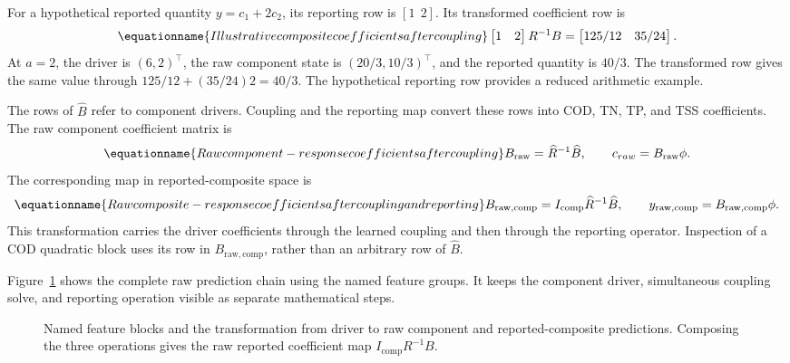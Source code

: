 For a hypothetical reported quantity \(y=c_1+2c_2\), its reporting row is \([1\ \ 2]\). Its transformed coefficient row is
\begin{equation}
\equationname{Illustrative composite coefficients after coupling}
\label{eq:icsor_small_composite_projection}
\begin{bmatrix}1&2\end{bmatrix}R^{-1}B
=\begin{bmatrix}125/12&35/24\end{bmatrix}.
\end{equation}
At \(a=2\), the driver is \((6,2)^\top\), the raw component state is \((20/3,10/3)^\top\), and the reported quantity is \(40/3\). The transformed row gives the same value through \(125/12+(35/24)2=40/3\). The hypothetical reporting row provides a reduced arithmetic example.

The rows of \(\widehat B\) refer to component drivers. Coupling and the reporting map convert these rows into COD, TN, TP, and TSS coefficients. The raw component coefficient matrix is
\begin{equation}
\equationname{Raw component-response coefficients after coupling}
\label{eq:icsor_raw_component_coefficients}
B_{\mathrm{raw}}=\widehat R^{-1}\widehat B,
\qquad c_{raw}=B_{\mathrm{raw}}\phi.
\end{equation}
The corresponding map in reported-composite space is
\begin{equation}
\equationname{Raw composite-response coefficients after coupling and reporting}
\label{eq:icsor_raw_composite_coefficients}
B_{\mathrm{raw,comp}}=I_{\mathrm{comp}}\widehat R^{-1}\widehat B,
\qquad y_{\mathrm{raw,comp}}=B_{\mathrm{raw,comp}}\phi.
\end{equation}
This transformation carries the driver coefficients through the learned coupling and then through the reporting operator. Inspection of a COD quadratic block uses its row in \(B_{\mathrm{raw,comp}}\), rather than an arbitrary row of \(\widehat B\).

Figure~\ref{fig:ch5_prediction_chain} shows the complete raw prediction chain using the named feature groups. It keeps the component driver, simultaneous coupling solve, and reporting operation visible as separate mathematical steps.

\begin{figure}[htbp]
\centering

\caption{Named feature blocks and the transformation from driver to raw component and reported-composite predictions. Composing the three operations gives the raw reported coefficient map \(I_{\mathrm{comp}}R^{-1}B\).}
\label{fig:ch5_prediction_chain}
\end{figure}

